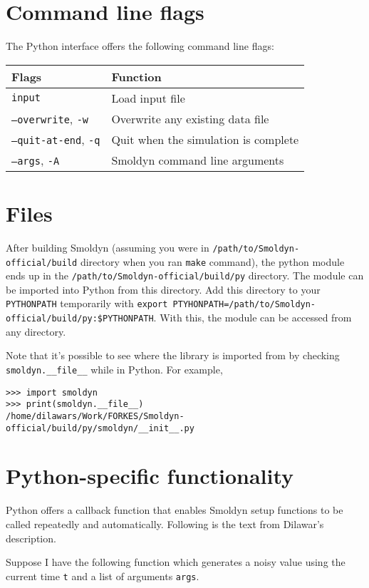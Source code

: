 \documentclass {book}
\newcommand {\ttt} {\texttt}
\begin{document}
\section{Command line flags}

The Python interface offers the following command line flags:

\begin{longtable}[c]{ll}
Flags & Function\\
\hline
\ttt{input} & Load input file\\
\ttt{--overwrite}, \ttt{-w} & Overwrite any existing data file\\
\ttt{--quit-at-end}, \ttt{-q} & Quit when the simulation is complete\\
\ttt{--args}, \ttt{-A} & Smoldyn command line arguments
\end{longtable}

\section{Files}

After building Smoldyn (assuming you were in \ttt{/path/to/Smoldyn-official/build} directory when you ran \ttt{make} command), the python module ends up in the \ttt{/path/to/Smoldyn-official/build/py} directory. The module can be imported into Python from this directory. Add this directory to your
\ttt{PYTHONPATH} temporarily with \ttt{export PTYHONPATH=/path/to/Smoldyn-official/build/py:\$PYTHONPATH}. With this, the module can be accessed from any directory.

Note that it's possible to see where the library is imported from by checking
\verb|smoldyn.__file__| while in Python. For example,

\begin{verbatim}
>>> import smoldyn
>>> print(smoldyn.__file__)
/home/dilawars/Work/FORKES/Smoldyn-official/build/py/smoldyn/__init__.py
\end{verbatim}


\section{Python-specific functionality}

Python offers a callback function that enables Smoldyn setup functions to be called repeatedly and automatically. Following is the text from Dilawar's description.

Suppose I have the following function which generates a noisy value using the current time \ttt{t} and a list of arguments \ttt{args}.
\end{document}
